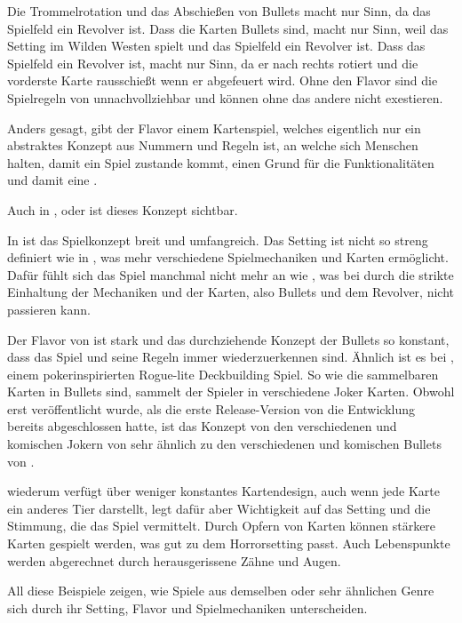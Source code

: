 Die Trommelrotation und das Abschießen von Bullets macht nur Sinn, da das Spielfeld ein Revolver ist.
Dass die Karten Bullets sind, macht nur Sinn, weil das Setting im Wilden Westen spielt und das Spielfeld ein Revolver ist.
Dass das Spielfeld ein Revolver ist, macht nur Sinn, da er nach rechts rotiert und die vorderste Karte rausschießt wenn er abgefeuert wird.
Ohne den Flavor sind die Spielregeln von \FF unnachvollziehbar und können ohne das andere nicht exestieren.


Anders gesagt, gibt der Flavor einem Kartenspiel, welches eigentlich nur ein abstraktes Konzept aus Nummern und Regeln ist,
an welche sich Menschen halten, damit ein Spiel zustande kommt, einen Grund für die Funktionalitäten und damit eine .


Auch in ,  oder  ist dieses Konzept sichtbar.

In 
ist das Spielkonzept breit und umfangreich.
Das Setting ist nicht so streng definiert wie in \FF, was mehr verschiedene Spielmechaniken und Karten ermöglicht.
Dafür fühlt sich das Spiel manchmal nicht mehr an wie ,
was bei \FF durch die strikte Einhaltung der Mechaniken und der Karten, also Bullets und dem Revolver, nicht passieren kann.


Der Flavor von \FF ist stark und das durchziehende Konzept der Bullets so konstant, dass das Spiel und seine Regeln immer
wiederzuerkennen sind. Ähnlich ist es bei , einem pokerinspirierten Rogue-lite Deckbuilding Spiel.
So wie die sammelbaren Karten in \FF Bullets sind, sammelt der Spieler in  verschiedene Joker Karten.
Obwohl  erst veröffentlicht wurde, als die erste Release-Version von \FF die Entwicklung bereits abgeschlossen hatte,
ist das Konzept von den verschiedenen und komischen Jokern von  sehr ähnlich zu den verschiedenen und
komischen Bullets von \FF. 


 wiederum verfügt über weniger konstantes Kartendesign, auch wenn jede Karte ein anderes Tier darstellt,
legt dafür aber Wichtigkeit auf das Setting und die Stimmung, die das Spiel vermittelt. Durch Opfern von Karten können stärkere Karten
gespielt werden, was gut zu dem Horrorsetting passt. Auch Lebenspunkte werden abgerechnet durch herausgerissene Zähne und Augen.


All diese Beispiele zeigen, wie Spiele aus demselben oder sehr ähnlichen Genre sich durch ihr Setting, Flavor und Spielmechaniken unterscheiden.



